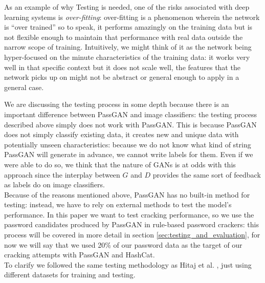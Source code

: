 As an example of why Testing is needed, one of the risks associated with deep learning systems is \emph{over-fitting}: over-fitting is a phenomenon wherein the network is \enquote{over trained} so to speak, it performs amazingly on the training data but is not flexible enough to maintain that performance with real data outside the narrow scope of training. Intuitively, we might think of it as the network being hyper-focused on the minute characteristics of the training data: it works very well in that specific context but it does not scale well, the features that the network picks up on might not be abstract or general enough to apply in a general case. 

We are discussing the testing process in some depth because there is an important difference between PassGAN and image classifiers: the testing process described above simply does not work with PassGAN.
This is because PassGAN does not simply classify existing data, it creates new and unique data with potentially unseen characteristics: because we do  not know what kind of string PassGAN will generate in advance, we cannot write labels for them. Even if we were able to do so, we think that the nature of GANs is at odds with this approach since the interplay between $G$ and $D$ provides the same sort of feedback as labels do on image classifiers.\\


Because of the reasons mentioned above, PassGAN has no built-in method for testing: instead, we have to rely on external methods to test the model's performance.
In this paper we want to test cracking performance, so we use the password candidates produced by PassGAN in rule-based password crackers: this process will be covered in more detail in section \ref{sec:testing_and_evaluation}, for now we will say that we used 20\% of our password data as the target of our cracking attempts with PassGAN and HashCat.\\%
To clarify we followed the same testing methodology as Hitaj et  al. \cite{PassGAN}, just using different datasets for training and testing.

